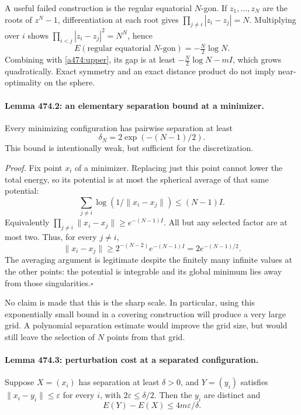 \documentclass[11pt]{article}
\begin{document}
A useful failed construction is the regular equatorial $N$-gon. If
$z_1,\ldots,z_N$ are the roots of $z^N-1$, differentiation at each root
gives $\prod_{j\ne i}|z_i-z_j|=N$. Multiplying over $i$ shows
$\prod_{i<j}|z_i-z_j|^2=N^N$, hence
\[
 E(\text{regular equatorial }N\text{-gon})=-\tfrac N2\log N.
\]
Combining with \eqref{a474:upper}, its gap is at least
$-\tfrac N2\log N-mI$, which grows quadratically. Exact symmetry and
an exact distance product do not imply near-optimality on the sphere.

\paragraph{Lemma 474.2: an elementary separation bound at a minimizer.}
Every minimizing configuration has pairwise separation at least
\begin{equation}\label{a474:separation}
 \delta_N=2\exp(-(N-1)/2).
\end{equation}
This bound is intentionally weak, but sufficient for the discretization.

\emph{Proof.} Fix point $x_i$ of a minimizer. Replacing just this point
cannot lower the total energy, so its potential is at most the spherical
average of that same potential:
\[
 \sum_{j\ne i}\log(1/\|x_i-x_j\|)\le(N-1)I.
\]
Equivalently $\prod_{j\ne i}\|x_i-x_j\|\ge e^{-(N-1)I}$.
All but any selected factor are at most two. Thus, for every $j\ne i$,
\[
 \|x_i-x_j\|\ge 2^{-(N-2)}e^{-(N-1)I}
                  =2e^{-(N-1)/2}.
\]
The averaging argument is legitimate despite the finitely many infinite
values at the other points: the potential is integrable and its global
minimum lies away from those singularities.\hfill$\square$

No claim is made that this is the sharp scale. In particular, using this
exponentially small bound in a covering construction will produce a very
large grid. A polynomial separation estimate would improve the grid size,
but would still leave the selection of $N$ points from that grid.

\paragraph{Lemma 474.3: perturbation cost at a separated configuration.}
Suppose $X=(x_i)$ has separation at least $\delta>0$, and
$Y=(y_i)$ satisfies $\|x_i-y_i\|\le\varepsilon$ for every $i$, with
$2\varepsilon\le\delta/2$. Then the $y_i$ are distinct and
\begin{equation}\label{a474:perturb}
 E(Y)-E(X)\le4m\varepsilon/\delta.
\end{equation}
\end{document}
